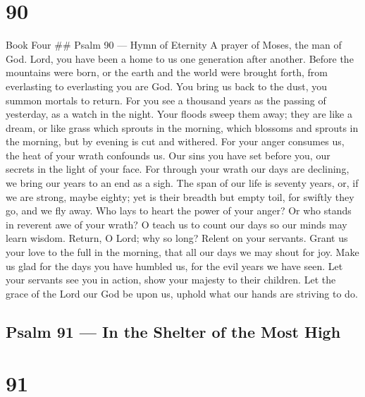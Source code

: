 \hypertarget{section-89}{%
\section{90}\label{section-89}}

Book Four \#\# Psalm 90 --- Hymn of Eternity A prayer of Moses, the man
of God.  Lord, you have been a home to us one generation
after another.  Before the mountains were born, or the earth
and the world were brought forth, from everlasting to everlasting you
are God.  You bring us back to the dust, you summon mortals
to return.  For you see a thousand years as the passing of
yesterday, as a watch in the night.  Your floods sweep them
away; they are like a dream, or like grass which sprouts in the morning,
 which blossoms and sprouts in the morning, but by evening
is cut and withered.  For your anger consumes us, the heat
of your wrath confounds us.  Our sins you have set before
you, our secrets in the light of your face.  For through
your wrath our days are declining, we bring our years to an end as a
sigh.  The span of our life is seventy years, or, if we are
strong, maybe eighty; yet is their breadth but empty toil, for swiftly
they go, and we fly away.  Who lays to heart the power of
your anger? Or who stands in reverent awe of your wrath?  O
teach us to count our days so our minds may learn wisdom. 
Return, O Lord; why so long? Relent on your servants. 
Grant us your love to the full in the morning, that all our days we may
shout for joy.  Make us glad for the days you have humbled
us, for the evil years we have seen.  Let your servants see
you in action, show your majesty to their children.  Let
the grace of the Lord our God be upon us, uphold what our hands are
striving to do.

\hypertarget{psalm-91-in-the-shelter-of-the-most-high}{%
\subsection{Psalm 91 --- In the Shelter of the Most
High}\label{psalm-91-in-the-shelter-of-the-most-high}}

\hypertarget{section-90}{%
\section{91}\label{section-90}}

